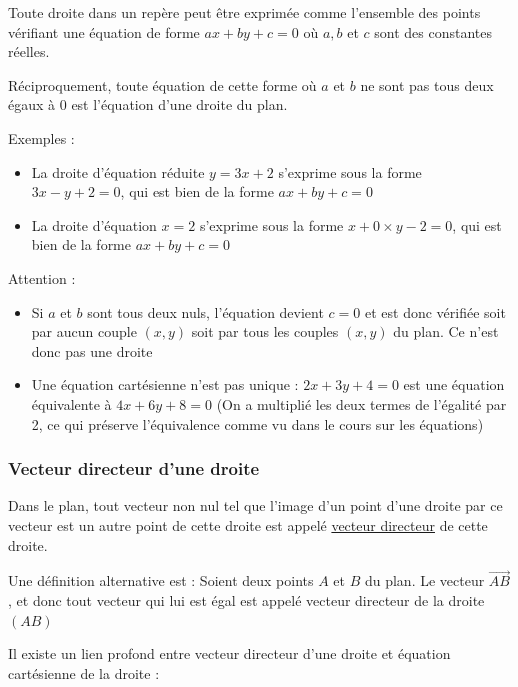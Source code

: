 \documentclass[10pt,a4paper,oneside]{book}
\begin{document}
\begin{de}
  Toute droite dans un repère peut être exprimée comme l'ensemble des points vérifiant une équation de forme $ax+by+c=0$ où $a,b$ et $c$ sont des constantes réelles. 

  Réciproquement, toute équation de cette forme où $a$ et $b$ ne sont pas tous deux égaux à $0$ est l'équation d'une droite du plan.
\end{de}

Exemples :\begin{itemize}
  \item La droite d'équation réduite $y=3x+2$ s'exprime sous la forme $3x-y+2=0$, qui est bien de la forme $ax+by+c=0$
  \item La droite d'équation $x=2$ s'exprime sous la forme $x+0 \times y-2=0$, qui est bien de la forme $ax+by+c=0$
\end{itemize}

Attention : \begin{itemize}
  \item Si $a$ et $b$ sont tous deux nuls, l'équation devient $c=0$ et est donc vérifiée soit par aucun couple $(x,y)$ soit par tous les couples $(x,y)$ du plan. Ce n'est donc pas une droite
  \item Une équation cartésienne n'est pas unique : $2x+3y+4=0$ est une équation équivalente à $4x+6y+8=0$ (On a multiplié les deux termes de l'égalité par 2, ce qui préserve l'équivalence comme vu dans le cours sur les équations)
\end{itemize}

\subsubsection{Vecteur directeur d'une droite}

\begin{de}
Dans le plan, tout vecteur non nul tel que l'image d'un point d'une droite par ce vecteur est un autre point de cette droite est appelé \underline{vecteur directeur} de cette droite.
\end{de}

Une définition alternative est : Soient deux points $A$ et $B$ du plan. Le vecteur $\overrightarrow{AB}$, et donc tout vecteur qui lui est égal est appelé vecteur directeur de la droite $(AB)$

Il existe un lien profond entre vecteur directeur d'une droite et équation cartésienne de la droite :
\end{document}
